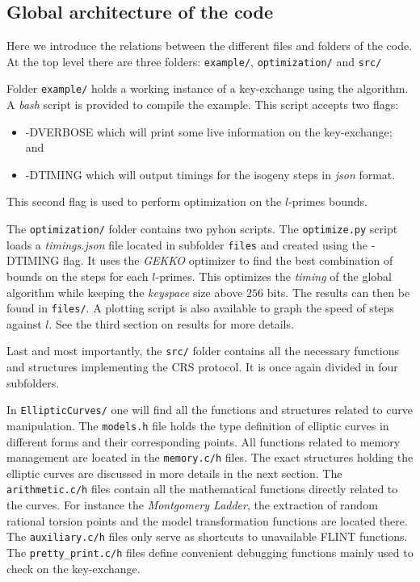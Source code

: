\documentclass[../main.tex]{subfiles}
\begin{document}
\subsection{Global architecture of the code}
Here we introduce the relations between the different files and folders of the code.
At the top level there are three folders: \texttt{example/}, \texttt{optimization/} and \texttt{src/}

Folder \texttt{example/} holds a working instance of a key-exchange using the algorithm.
A \textit{bash} script is provided to compile the example.
This script accepts two flags:
	\begin{itemize}
		\item -DVERBOSE which will print some live information on the key-exchange; and
		\item -DTIMING which will output timings for the isogeny steps in \textit{json} format.
	\end{itemize}
This second flag is used to perform optimization on the $l$-primes bounds.

The \texttt{optimization/} folder contains two pyhon scripts.
The \texttt{optimize.py} script loads a \textit{timings.json} file located in subfolder \texttt{files} and created using the -DTIMING flag.
It uses the \textit{GEKKO} optimizer to find the best combination of bounds on the steps for each $l$-primes.
This optimizes the \textit{timing} of the global algorithm while keeping the \textit{keyspace} size above $256$ bits.
The results can then be found in \texttt{files/}.
A plotting script is also available to graph the speed of steps against $l$.
See the third section on results for more details.

Last and most importantly, the \texttt{src/} folder contains all the necessary functions and structures implementing the CRS protocol.
It is once again divided in four subfolders.

In \texttt{EllipticCurves/} one will find all the functions and structures related to curve manipulation.
The \texttt{models.h} file holds the type definition of elliptic curves in different forms and their corresponding points.
All functions related to memory management are located in the \texttt{memory.c/h} files.
The exact structures holding the elliptic curves are discussed in more details in the next section.
The \texttt{arithmetic.c/h} files contain all the mathematical functions directly related to the curves.
For instance the \textit{Montgomery Ladder}, the extraction of random rational torsion points and the model transformation functions are located there.
The \texttt{auxiliary.c/h} files only serve as shortcuts to unavailable FLINT functions.
The \texttt{pretty\_print.c/h} files define convenient debugging functions mainly used to check on the key-exchange.
\end{document}
